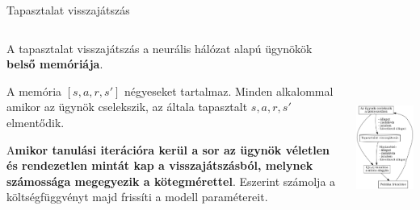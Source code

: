 \documentclass[english, aspectratio=169]{beamer}
\begin{document}
\begin{frame}{Tapasztalat visszajátszás}
\begin{columns}
\begin{column}{.5\textwidth}
A tapasztalat visszajátszás a neurális hálózat alapú ügynökök \textbf{belső memóriája}.\par\smallskip
A memória $\left[ s,a,r,s' \right]$ négyeseket tartalmaz. Minden alkalommal amikor az ügynök cselekszik, az általa tapasztalt $s,a,r,s'$ elmentődik.\par\smallskip
A\textbf{mikor tanulási iterációra kerül a sor az ügynök véletlen és rendezetlen mintát kap a visszajátszásból, melynek számossága megegyezik a kötegmérettel}. Eszerint számolja a költségfüggvényt majd frissíti a modell paramétereit. 
\end{column}
\begin{column}{.5\textwidth}
\begin{center}
\includegraphics[width=7cm, height=7cm, keepaspectratio]{graphs/reinforcement_9.png}
\end{center}
\end{column}
\end{columns}
\end{frame}
\end{document}
